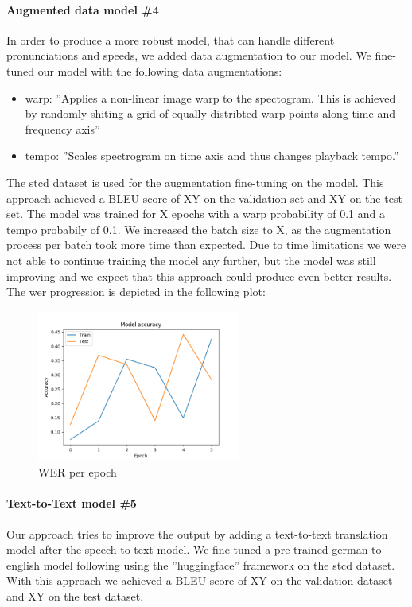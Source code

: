 \paragraph{Augmented data model \#4} In order to produce a more robust model, that can handle different pronunciations and speeds, we added data augmentation to our  model. We fine-tuned our
model with the following data augmentations:
\begin{itemize}
    \item warp: ''Applies a non-linear image warp to the spectogram. This is achieved by randomly shiting a grid of equally distribted warp points along time and frequency axis''
    \cite{DeepSpeechAugmentation}
    \item tempo: ''Scales spectrogram on time axis and thus changes playback tempo.'' \cite{DeepSpeechAugmentation}
\end{itemize}

The \gls{stcd} dataset is used for the augmentation fine-tuning on the  model. This approach achieved a BLEU score of XY on the validation set and XY on the test set. The model was trained for
X epochs with a warp probability of 0.1 and a tempo probabily of 0.1. We increased the batch size to X, as the augmentation process per batch took more time than expected. Due to time limitations we
were not able to continue training the model any further, but the model was still improving and we expect that this approach could produce even better results. The \gls{wer} progression is depicted in the following plot:
\begin{figure}[H]
    \includegraphics[width=\linewidth,height=5cm]{img/werPlot.png}
    \caption{WER per epoch}
    \label{fig:werPerEpoch}
\end{figure}

\paragraph{Text-to-Text model \#5} Our  approach tries to improve the output by adding a text-to-text translation model after the speech-to-text model. We fine tuned a pre-trained german to
english model following  using the ''huggingface'' framework \cite{wolf-etal-2020-transformers} on the \gls{stcd} dataset. With this approach we achieved a BLEU score of XY on the validation dataset and
XY on the test dataset.
